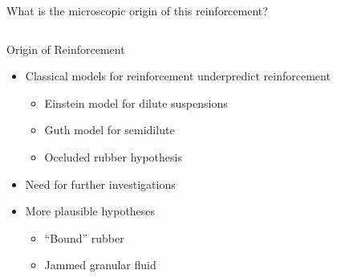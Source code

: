 \documentclass[aspectratio=169,xcolor=table]{beamer}
\begin{document}
\begin{frame}[c]{What is the microscopic origin of this reinforcement?}
\begin{columns}[T]
     \vspace{-0.5\baselineskip}
      \begin{block}{Origin of Reinforcement}
      \begin{itemize}
        \item Classical models for reinforcement underpredict reinforcement
        \begin{itemize}
          \item<2-> Einstein model for dilute suspensions
          \item<2-> Guth model for semidilute
          \item<2-> Occluded rubber hypothesis
        \end{itemize}
        \item<3-> Need for further investigations
        \item<4-> More plausible hypotheses
        \begin{itemize}
          \item<5-> ``Bound'' rubber
          \item<6-> Jammed granular fluid
        \end{itemize}
      \end{itemize}
      \end{block}


  \end{columns}
\end{frame}
\end{document}
